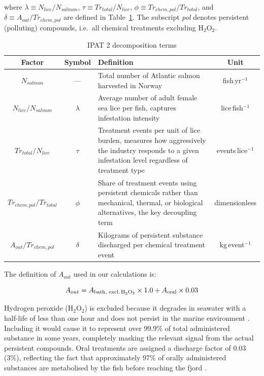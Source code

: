\documentclass[12pt, a4paper]{report}
\begin{document}
where $\lambda \equiv N_{lice}/N_{salmon}$, $\tau \equiv Tr_{total}/N_{lice}$, 
$\phi \equiv Tr_{chem,pol}/Tr_{total}$, and $\delta \equiv A_{out}/Tr_{chem,pol}$ 
are defined in Table~\ref{tab:ipat2}. The subscript \textit{pol} denotes persistent (polluting) compounds, i.e.\ all chemical treatments excluding H$_2$O$_2$.

\begin{table}[h]
\centering
\caption{IPAT 2 decomposition terms}
\begin{tabularx}{\textwidth}{c c X c}
\hline
\textbf{Factor} & \textbf{Symbol} & \textbf{Definition} & \textbf{Unit} \\
\hline
$N_{salmon}$
    & ---
    & Total number of Atlantic salmon harvested in Norway
    & fish\,yr$^{-1}$ \\[4pt]
$N_{lice}/N_{salmon}$
    & $\lambda$
    & Average number of adult female sea lice per fish,
    captures infestation intensity
    & lice\,fish$^{-1}$ \\[4pt]
$Tr_{total}/N_{lice}$
    & $\tau$
    & Treatment events per unit of lice burden, measures
    how aggressively the industry responds to a given
    infestation level regardless of treatment type
    & events\,lice$^{-1}$ \\[4pt]
$Tr_{chem,pol}/Tr_{total}$
    & $\phi$
    & Share of treatment events using persistent chemicals
    rather than mechanical, thermal, or biological
    alternatives, the key decoupling term
    & dimensionless \\[4pt]
$A_{out}/Tr_{chem,pol}$
    & $\delta$
    & Kilograms of persistent substance discharged per
    chemical treatment event
    & kg\,event$^{-1}$ \\
\hline
\end{tabularx}
\label{tab:ipat2}
\end{table}

The definition of $A_{out}$ used in our calculations
is:

\begin{equation}
    A_{out} = A_{\text{bath, excl.\,H}_2\text{O}_2} \times 1.0
                + A_{\text{oral}} \times 0.03
\end{equation}

Hydrogen peroxide (H$_2$O$_2$) is excluded because it degrades in seawater with a half-life of less than one hour and does not persist in the marine environment \citep{myhrjensen2020}. Including it would cause it to represent over 99.9\% of total administered substance in some years, completely masking the relevant signal from the actual persistent compounds. Oral treatments are assigned a discharge factor of 0.03 (3\%), reflecting the fact that approximately 97\% of orally administered substances are metabolised by the fish before reaching the fjord \citep{myhrjensen2020}.
\end{document}
